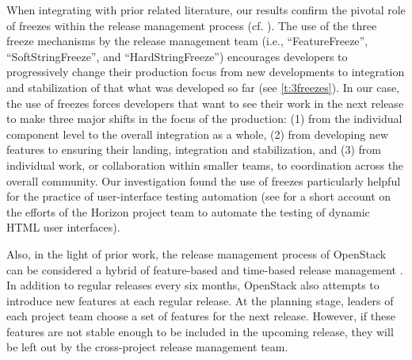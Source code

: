 \documentclass[dvipsnames]{bmcart}
\theoremstyle{definition}
\begin{document}



When integrating with prior related literature, our results confirm the pivotal role of freezes within the release management process (cf. \cite{fitzgerald2011open,Anand2017}).
%
The use of the three freeze mechanisms by the release management team (i.e., “FeatureFreeze”, “SoftStringFreeze”,  and “HardStringFreeze”) encourages developers to progressively change their production focus from new developments to integration and stabilization of that what was developed so far (see \cref{t:3freezes}). 
% 
In our case, the use of freezes forces developers that want to see their work in the next release to make three major shifts in the focus of the production: (1)  from the individual component level to the overall integration as a whole, (2) from developing new features to ensuring their landing, integration and stabilization, and (3) from individual work, or collaboration within smaller teams, to coordination across the overall community. Our investigation found the use of freezes particularly helpful for the practice of user-interface testing automation (see  for a short account on the efforts of the Horizon project team to automate the testing of dynamic HTML user interfaces). 





Also, in the light of prior work, the  release management process of OpenStack can be considered a hybrid of feature-based and time-based release management \cite[pp 23]{wright2012release}. In addition to regular releases every six months, OpenStack also attempts to introduce new features at each regular release. At the planning stage, leaders of each project team choose a set of features  for the  next release. However, if these features are not stable enough to be included in the upcoming release, they will be left out by the cross-project release management team. 
\end{document}
